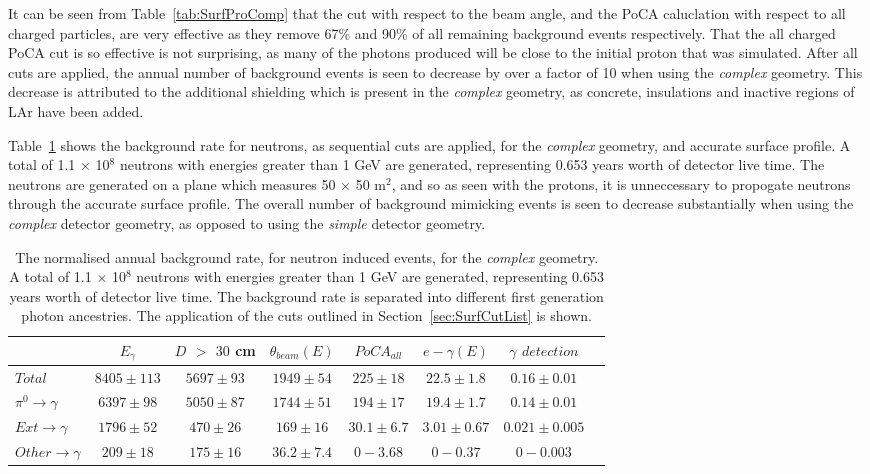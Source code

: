 It can be seen from Table~\ref{tab:SurfProComp} that the cut with respect to the beam angle, and the PoCA caluclation with respect to all charged particles, are very effective as they remove 67\% and 90\% of all remaining background events respectively. That the all charged PoCA cut is so effective is not surprising, as many of the photons produced will be close to the initial proton that was simulated. After all cuts are applied, the annual number of background events is seen to decrease by over a factor of 10 when using the \emph{complex} geometry. This decrease is attributed to the additional shielding which is present in the \emph{complex} geometry, as concrete, insulations and inactive regions of LAr have been added.

Table~\ref{tab:SurfNeuComp} shows the background rate for neutrons, as sequential cuts are applied, for the \emph{complex} geometry, and accurate surface profile. A total of 1.1 $\times$ 10$^8$ neutrons with energies greater than 1 GeV are generated, representing 0.653 years worth of detector live time. The neutrons are generated on a plane which measures 50 $\times$ 50 m$^{2}$, and so as seen with the protons, it is unneccessary to propogate neutrons through the accurate surface profile. The overall number of background mimicking events is seen to decrease substantially when using the \emph{complex} detector geometry, as opposed to using the \emph{simple} detector geometry. \\

\begin{table}
  \caption[The normalised annual background rate, for neutron induced events, for the \emph{complex} geometry]
          {The normalised annual background rate, for neutron induced events, for the \emph{complex} geometry. A total of 1.1 $\times$ 10$^8$ neutrons with energies greater than 1 GeV are generated, representing 0.653 years worth of detector live time. The background rate is separated into different first generation photon ancestries. The application of the cuts outlined in Section~\ref{sec:SurfCutList} is shown.}
  \label{tab:SurfNeuComp}
  \centering
  \scriptsize
  \begin{tabular}{l c c c c c c c }
    \toprule
        & $E_\gamma$ &  $D$ $>$ $30$ cm & $\theta_{beam}(E)$ & $PoCA_{all}$ & $e-\gamma(E)$ & $\gamma$ $detection$ \\
        \midrule
        $Total$          & $8405\pm113$ & $5697\pm93$ & $1949\pm54$  & $225\pm18$   & $22.5\pm1.8$  & $0.16\pm0.01$ \\

        $\pi^0\to\gamma$ & $6397\pm98$  & $5050\pm87$ & $1744\pm51$  & $194\pm17$   & $19.4\pm1.7$  & $0.14\pm0.01$ \\

        $Ext\to\gamma$   & $1796\pm52$  & $470\pm26$  & $169\pm16$   & $30.1\pm6.7$ & $3.01\pm0.67$ & $0.021\pm0.005$ \\

        $Other\to\gamma$ & $209\pm18$   & $175\pm16$  & $36.2\pm7.4$ & $0-3.68$     & $0-0.37$      & $0-0.003$ \\
        \bottomrule
  \end{tabular}
\end{table}

